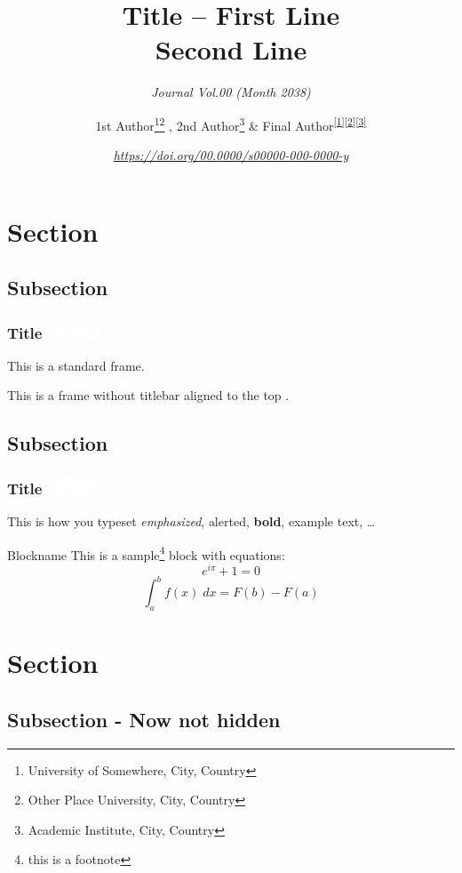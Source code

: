 \documentclass[aspectratio=1610]{beamer}
\title{Title -- First Line\\ 
        Second Line\\}
\subtitle{\textit{Journal Vol.00 (Month 2038)}}
\author{1st Author\footnote
            {\label{1} University of Somewhere, City, Country}\footnote
            {\label{2} Other Place University, City, Country} ,
        2nd Author\footnote
            {\label{3} Academic Institute, City, Country} \& 
        Final Author\textsuperscript{\ref{1}\ref{2}\ref{3}}}
\institute{Presented by:\\ 
            Name and Surname\\
            29$^\text{th}$ February 2038}
\date{\textit{\tiny{\url{https://doi.org/00.0000/s00000-000-0000-y}}}}
\newcommand{\njulogo}
  {\hfill {\includegraphics[height=0.5cm]{njulogo/njuname_c.png}}}
\begin{document}
\begin{frame}
  \titlepage
\end{frame}

\section{Section \thesection}
  \subsection{Subsection \thesubsection}
  
    \begin{frame}
      \frametitle{Title \njulogo}
        This is a standard frame.
    \end{frame}
    
    \begin{frame}[t]
        This is a frame without titlebar aligned to the top .
    \end{frame}
  
  \subsection{Subsection \thesubsection}

    \begin{frame}
      \frametitle{Title \njulogo}
          This is how you typeset \emph{emphasized}, \alert{alerted}, \textbf{bold}, \textcolor{example}{example text}, \dots
          \vfill
          \begin{block}{Blockname}
            This is a sample\footnote{this is a footnote} block with equations:
              \begin{equation}
                e^{i\pi} + 1 = 0
              \end{equation}
              \begin{equation}
                \int_{a}^{b} f(x) \; dx =  F(b) - F(a)
              \end{equation}
          \end{block}
    \end{frame}
  
\section{Section \thesection}
  \subsection{Subsection \thesubsection - Now not hidden}
  
\end{document}
